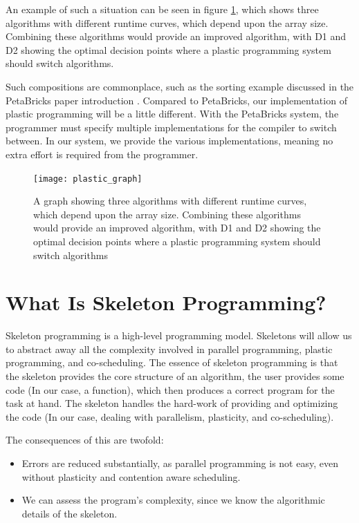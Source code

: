 An example of such a situation can be seen in figure \ref{fig:plastic_graph}, which shows three algorithms with different runtime curves, which depend upon the array size. Combining these algorithms would provide an improved algorithm, with D1 and D2 showing the optimal decision points where a plastic programming system should switch algorithms.

Such compositions are commonplace, such as the sorting example discussed in the PetaBricks paper introduction \cite{petabricks}. Compared to PetaBricks, our implementation of plastic programming will be a little different. With the PetaBricks system, the programmer must specify multiple implementations for the compiler to switch between. In our system, we provide the various implementations, meaning no extra effort is required from the programmer.



\begin{figure}
	\centering
	\texttt{[image: plastic\_graph]}
	\caption{A graph showing three algorithms with different runtime curves, which depend upon the array size. Combining these algorithms would provide an improved algorithm, with D1 and D2 showing the optimal decision points where a plastic programming system should switch algorithms}
	\label{fig:plastic_graph}
\end{figure}



\section{What Is Skeleton Programming?}

Skeleton programming is a high-level programming model. Skeletons will allow us to abstract away all the complexity involved in parallel programming, plastic programming, and co-scheduling. The essence of skeleton programming is that the skeleton provides the core structure of an algorithm, the user provides some code (In our case, a function), which then produces a correct program for the task at hand. The skeleton handles the hard-work of providing and optimizing the code (In our case, dealing with parallelism, plasticity, and co-scheduling). 

The consequences of this are twofold:

\begin{itemize}
	\item Errors are reduced substantially, as parallel programming is not easy, even without plasticity and contention aware scheduling.
	\item We can assess the program's complexity, since we know the algorithmic details of the skeleton.
\end{itemize}

